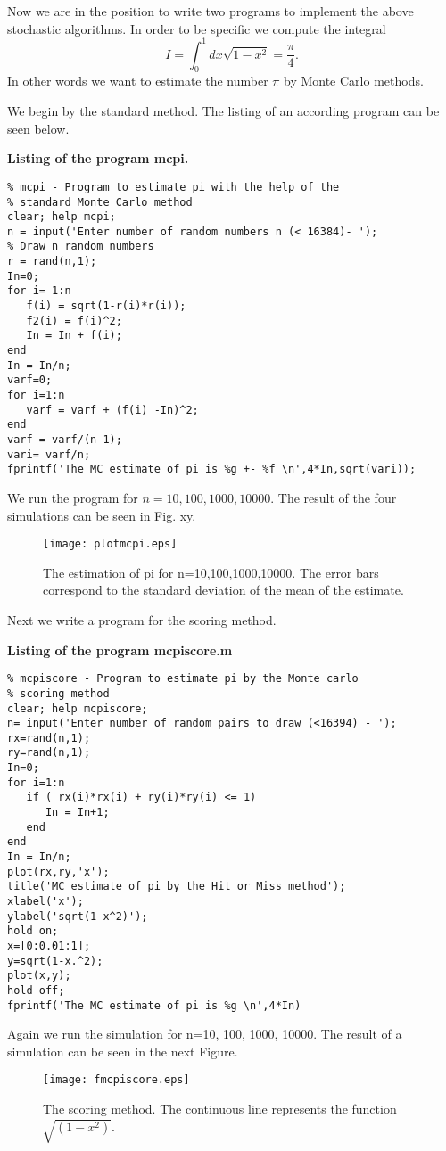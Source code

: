 Now we are in the position to write two programs to implement the above
stochastic algorithms. In order to be specific we compute the integral
\begin{equation}
I = \int_0^1 dx \sqrt{1-x^2} = \frac{\pi}{4}.
\end{equation}
In other words we want to estimate the number $\pi$ by Monte Carlo
methods.

We begin by the standard method. The listing of an according 
program can be seen below.

{\bf Listing of the program mcpi.}
\begin{verbatim}
% mcpi - Program to estimate pi with the help of the
% standard Monte Carlo method
clear; help mcpi;
n = input('Enter number of random numbers n (< 16384)- ');
% Draw n random numbers
r = rand(n,1);
In=0;
for i= 1:n
   f(i) = sqrt(1-r(i)*r(i));
   f2(i) = f(i)^2;
   In = In + f(i);
end
In = In/n;
varf=0;
for i=1:n
   varf = varf + (f(i) -In)^2;
end
varf = varf/(n-1);
vari= varf/n;
fprintf('The MC estimate of pi is %g +- %f \n',4*In,sqrt(vari));
\end{verbatim}

We run the program for $n=10, 100, 1000, 10000$. The result of the 
four simulations can be seen in Fig. xy.
\begin{figure}
\texttt{[image: plotmcpi.eps]}
\caption{The estimation of pi for n=10,100,1000,10000. The 
error bars correspond to the standard deviation of the mean of the 
estimate.}
\end{figure}

Next we write a program for the scoring  method. 

{\bf Listing of the program mcpiscore.m}

\begin{verbatim}
% mcpiscore - Program to estimate pi by the Monte carlo
% scoring method
clear; help mcpiscore;
n= input('Enter number of random pairs to draw (<16394) - ');
rx=rand(n,1);
ry=rand(n,1);
In=0;
for i=1:n
   if ( rx(i)*rx(i) + ry(i)*ry(i) <= 1)
      In = In+1;
   end
end
In = In/n;
plot(rx,ry,'x');
title('MC estimate of pi by the Hit or Miss method');
xlabel('x');
ylabel('sqrt(1-x^2)');
hold on;
x=[0:0.01:1];
y=sqrt(1-x.^2);
plot(x,y);
hold off;
fprintf('The MC estimate of pi is %g \n',4*In)
\end{verbatim}
Again we run the simulation for n=10, 100, 1000, 10000.
The result of a simulation can be seen in the next Figure.
\begin{figure}
\texttt{[image: fmcpiscore.eps]}
\caption{The scoring method. The continuous line represents
the function $\sqrt{(1-x^2)}$.}
\end{figure}


